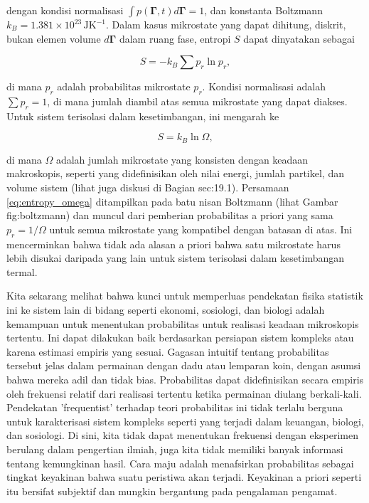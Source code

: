 \documentclass[a4paper,12pt]{book}
\begin{document}
dengan kondisi normalisasi $\int p(\mathbf{\Gamma}, t) d\mathbf{\Gamma} = 1$, dan konstanta Boltzmann $k_B = 1.381 \times 10^{23} \, \text{JK}^{-1}$. Dalam kasus mikrostate yang dapat dihitung, diskrit, bukan elemen volume $d\mathbf{\Gamma}$ dalam ruang fase, entropi $S$ dapat dinyatakan sebagai

\begin{equation}
S = -k_B \sum p_r \ln p_r,
\label{eq:entropy_discrete}
\end{equation}

di mana $p_r$ adalah probabilitas mikrostate $p_r$. Kondisi normalisasi adalah $\sum p_r = 1$, di mana jumlah diambil atas semua mikrostate yang dapat diakses. Untuk sistem terisolasi dalam kesetimbangan, ini mengarah ke

\begin{equation}
S = k_B \ln \Omega,
\label{eq:entropy_omega}
\end{equation}

di mana $\Omega$ adalah jumlah mikrostate yang konsisten dengan keadaan makroskopis, seperti yang didefinisikan oleh nilai energi, jumlah partikel, dan volume sistem (lihat juga diskusi di Bagian  {sec:19.1}). Persamaan \eqref{eq:entropy_omega} ditampilkan pada batu nisan Boltzmann (lihat Gambar  {fig:boltzmann}) dan muncul dari pemberian probabilitas a priori yang sama $p_r = 1/\Omega$ untuk semua mikrostate yang kompatibel dengan batasan di atas. Ini mencerminkan bahwa tidak ada alasan a priori bahwa satu mikrostate harus lebih disukai daripada yang lain untuk sistem terisolasi dalam kesetimbangan termal.

Kita sekarang melihat bahwa kunci untuk memperluas pendekatan fisika statistik ini ke sistem lain di bidang seperti ekonomi, sosiologi, dan biologi adalah kemampuan untuk menentukan probabilitas untuk realisasi keadaan mikroskopis tertentu. Ini dapat dilakukan baik berdasarkan persiapan sistem kompleks atau karena estimasi empiris yang sesuai. Gagasan intuitif tentang probabilitas tersebut jelas dalam permainan dengan dadu atau lemparan koin, dengan asumsi bahwa mereka adil dan tidak bias. Probabilitas dapat didefinisikan secara empiris oleh frekuensi relatif dari realisasi tertentu ketika permainan diulang berkali-kali. Pendekatan 'frequentist' terhadap teori probabilitas ini tidak terlalu berguna untuk karakterisasi sistem kompleks seperti yang terjadi dalam keuangan, biologi, dan sosiologi. Di sini, kita tidak dapat menentukan frekuensi dengan eksperimen berulang dalam pengertian ilmiah, juga kita tidak memiliki banyak informasi tentang kemungkinan hasil. Cara maju adalah menafsirkan probabilitas sebagai tingkat keyakinan bahwa suatu peristiwa akan terjadi. Keyakinan a priori seperti itu bersifat subjektif dan mungkin bergantung pada pengalaman pengamat.
\end{document}

